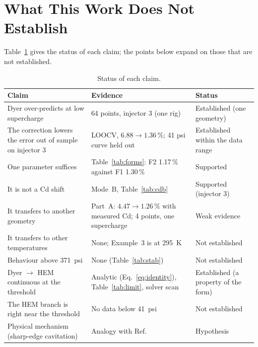 \documentclass[11pt,a4paper]{article}
\begin{document}
\section{What This Work Does Not Establish}\label{sec:not}
Table~\ref{tab:claims} gives the status of each claim; the points below expand on those that are not established.

\begin{table}[!htbp]
\centering\small
\caption{Status of each claim.}
\label{tab:claims}
\begin{tabular}{p{4.5cm}p{6.8cm}p{3.5cm}}\toprule
Claim & Evidence & Status\\\midrule
Dyer over-predicts at low supercharge & 64 points, injector 3 (one rig) & Established (one geometry)\\
The correction lowers the error out of sample on injector 3 & LOOCV, $6.88\to1.36\,\%$; 41 psi curve held out & Established within the data range\\
One parameter suffices & Table~\ref{tab:forms}: F2 1.17\,\% against F1 1.30\,\% & Supported\\
It is not a Cd shift & Mode~B, Table~\ref{tab:cdb} & Supported (injector 3)\\
It transfers to another geometry & Part~A: $4.47\to1.26\,\%$ with measured Cd; 4 points, one supercharge & Weak evidence\\
It transfers to other temperatures & None; Example~3 is at 295~K & Not established\\
Behaviour above 371~psi & None (Table~\ref{tab:stab}) & Not established\\
Dyer $\to$ HEM continuous at the threshold & Analytic (Eq.~\eqref{eq:identity}), Table~\ref{tab:limit}, solver scan & Established (a property of the form)\\
The HEM branch is right near the threshold & No data below 41~psi & Not established\\
Physical mechanism (sharp-edge cavitation) & Analogy with Ref.~\cite{nino2019} & Hypothesis\\\bottomrule
\end{tabular}
\end{table}
\end{document}
